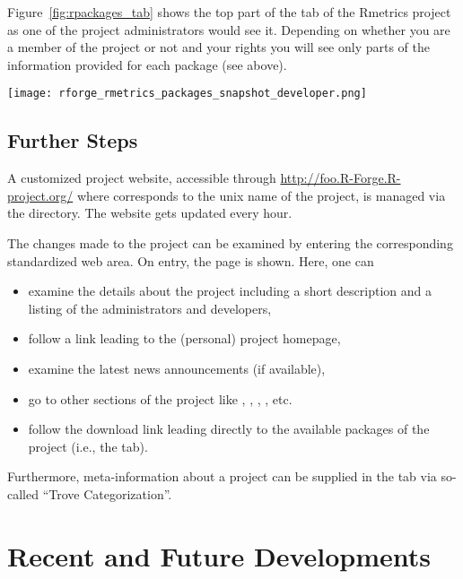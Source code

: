 Figure~\ref{fig:rpackages_tab} shows the top part of the  tab of the Rmetrics project as one of the project
administrators would see it. Depending on whether you are a member of
the project or not and your rights you will see only parts of the
information provided for each package (see above).

\begin{figure*}[th]
\centering
\texttt{[image: rforge\_rmetrics\_packages\_snapshot\_developer.png]}
\caption{ tab of the Rmetrics project}
\label{fig:rpackages_tab}
\end{figure*}

\subsection{Further Steps}

A customized project website, accessible through
\url{http://foo.R-Forge.R-project.org/} where  
corresponds to the unix name of the project, is managed via the
 directory. The website gets updated every hour. 

The changes made to the project can be examined by entering the
corresponding standardized web area. On entry, the 
page is shown. Here, one can 

\begin{itemize}
\item examine the details about the project including a short
  description and a listing of the administrators and developers,
\item follow a link leading to the (personal) project homepage,
\item examine the latest news announcements (if available),
\item go to other sections of the project like
  , ,
   , , etc.
\item follow the download link leading directly to the available
  packages of the project (i.e., the  tab).
\end{itemize}

Furthermore, meta-information about a project can be supplied in
the  tab via so-called ``Trove Categorization''. 


\section*{Recent and Future Developments}

